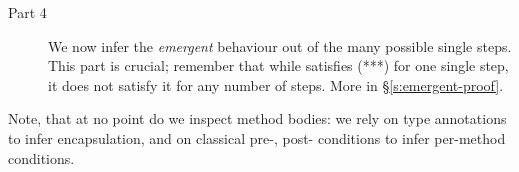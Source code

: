 \begin{description}
\item[Part 4]
  
We now infer the \emph{emergent} behaviour out of the many possible 
single steps.  This part is crucial;   remember that while  satisfies  
(***) for one single step, it does not satisfy it for any number of steps. More in \S\ref{s:emergent-proof}.
 
\end{description} 

\noindent
Note, that at no point do we inspect method bodies: we rely on type annotations
 to infer encapsulation, and on classical pre-, post- conditions to infer per-method conditions.

